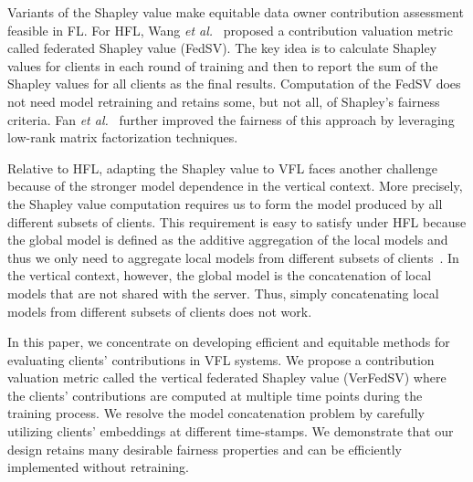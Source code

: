 Variants of the Shapley value make equitable data owner contribution assessment feasible in FL. For HFL, Wang \textit{et al.}~\cite{wang2020principled} proposed a contribution valuation metric called federated Shapley value (FedSV). The key idea is to 
calculate Shapley values for clients in each round of training and then to report the sum of the Shapley values for all clients as the final results. Computation of the FedSV does not need model retraining and retains some, but not all, of Shapley's fairness criteria. Fan \textit{et al.}~\cite{fan2021improving} further improved the fairness of this approach by leveraging low-rank matrix factorization techniques. 

Relative to HFL, adapting the Shapley value to VFL faces another challenge because of the stronger model dependence in the vertical context. More precisely, the Shapley value computation requires us to form the model produced by all different subsets of clients. This requirement is easy to satisfy under HFL because the global model is defined as the additive aggregation of the local models and thus we only need to aggregate local models from different subsets of clients~\cite{wang2020principled}. In the vertical context, however, the global model is the concatenation of local models that are not shared with the server. Thus, simply concatenating local models from different subsets of clients does not work. 

In this paper, we concentrate on developing efficient and equitable methods for evaluating clients' contributions in VFL systems. We propose a contribution valuation metric called the vertical federated Shapley value (VerFedSV)
where the clients' contributions are computed at multiple time points during the training process. We resolve the model concatenation problem by carefully utilizing clients' embeddings at different time-stamps. 
We demonstrate that our design retains many desirable fairness properties and can be efficiently implemented without retraining. 

